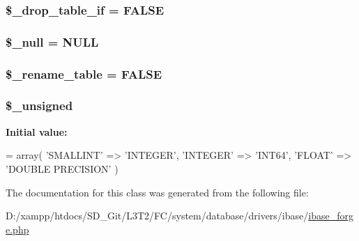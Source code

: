 \subsubsection[{\$\+\_\+drop\+\_\+table\+\_\+if}]{\setlength{\rightskip}{0pt plus 5cm}\$\+\_\+drop\+\_\+table\+\_\+if = F\+A\+L\+S\+E\hspace{0.3cm}{\ttfamily [protected]}}\label{class_c_i___d_b__ibase__forge_a92a8a9145a7fc91e252e58d019373581}
\hypertarget{class_c_i___d_b__ibase__forge_ae58fe6a5104d4a069a49b27533ce808f}{}
\subsubsection[{\$\+\_\+null}]{\setlength{\rightskip}{0pt plus 5cm}\$\+\_\+null = \textquotesingle{}N\+U\+L\+L\textquotesingle{}\hspace{0.3cm}{\ttfamily [protected]}}\label{class_c_i___d_b__ibase__forge_ae58fe6a5104d4a069a49b27533ce808f}
\hypertarget{class_c_i___d_b__ibase__forge_a1a649e7cf9de16bcf932977b18bc91de}{}
\subsubsection[{\$\+\_\+rename\+\_\+table}]{\setlength{\rightskip}{0pt plus 5cm}\$\+\_\+rename\+\_\+table = F\+A\+L\+S\+E\hspace{0.3cm}{\ttfamily [protected]}}\label{class_c_i___d_b__ibase__forge_a1a649e7cf9de16bcf932977b18bc91de}
\hypertarget{class_c_i___d_b__ibase__forge_aae977ae6d61fa183f0b25422b6ddc31c}{}
\subsubsection[{\$\+\_\+unsigned}]{\setlength{\rightskip}{0pt plus 5cm}\$\+\_\+unsigned\hspace{0.3cm}{\ttfamily [protected]}}\label{class_c_i___d_b__ibase__forge_aae977ae6d61fa183f0b25422b6ddc31c}
{\bfseries Initial value\+:}
\begin{DoxyCode}
= array(
        \textcolor{stringliteral}{'SMALLINT'}  => \textcolor{stringliteral}{'INTEGER'},
        \textcolor{stringliteral}{'INTEGER'}   => \textcolor{stringliteral}{'INT64'},
        \textcolor{stringliteral}{'FLOAT'}     => \textcolor{stringliteral}{'DOUBLE PRECISION'}
    )
\end{DoxyCode}


The documentation for this class was generated from the following file\+:\begin{DoxyCompactItemize}
\item 
D\+:/xampp/htdocs/\+S\+D\+\_\+\+Git/\+L3\+T2/\+F\+C/system/database/drivers/ibase/\hyperlink{ibase__forge_8php}{ibase\+\_\+forge.\+php}\end{DoxyCompactItemize}
